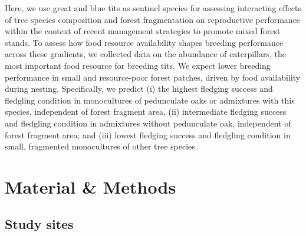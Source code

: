 \documentclass[10pt, twoside]{book} %
\begin{document}
Here, we use great and blue tits as sentinel species for assessing interacting effects of tree species composition and forest fragmentation on reproductive performance within the context of recent management strategies to promote mixed forest stands. To assess how food resource availability shapes breeding performance across these gradients, we collected data on the abundance of caterpillars, the most important food resource for breeding tits. We expect lower breeding performance in small and resource-poor forest patches, driven by food availability during nesting. Specifically, we predict (i) the highest fledging success and fledgling condition in monocultures of pedunculate oaks or admixtures with this species, independent of forest fragment area, (ii) intermediate fledging success and fledgling condition in admixtures without pedunculate oak, independent of forest fragment area; and (iii) lowest fledging success and fledgling condition in small, fragmented monocultures of other tree species.\\

\clearpage
	\section{Material \& Methods}
		\subsection*{Study sites}
		
\end{document}
